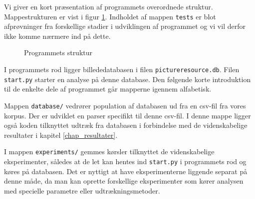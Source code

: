 {
{\sffamily Vi giver en kort præsentation af programmets overordnede
struktur. Mappestrukturen er vist i figur \ref{program_struktur}.
Indholdet af mappen \texttt{tests} er blot afprøvninger fra forskellige
stadier i udviklingen af programmet og vi vil derfor ikke komme nærmere
ind på dette.

\begin{figure}[!h]
    \caption[]{Programmets struktur}
    \label{program_struktur}
\end{figure}

I programmets rod ligger billededatabasen i filen
\texttt{pictureresource.db}. Filen \texttt{start.py} starter en analyse
på denne database. Den følgende korte introduktion til de enkelte dele
af programmet går mapperne igennem alfabetisk.

}

\vspace{1.4em}
\vspace{1.4em}
Mappen \texttt{database/} vedrører population af databasen ud fra en
csv-fil fra vores korpus. Der er udviklet en parser specifikt til denne
csv-fil. I denne mappe ligger også koden tilknyttet udtræk fra databasen
i forbindelse med de videnskabelige resultater i kapitel
\ref{chap_resultater}.

\vspace{1.4em}
\vspace{1.4em}

I mappen \texttt{experiments/} gemmes kørsler tilknyttet de
videnskabelige eksperimenter, således at de let kan hentes ind
\texttt{start.py} i programmets rod og køres på databasen. Det er
nyttigt at have eksperimenterne liggende separat på denne måde, da man
kan oprette forskellige eksperimenter som kører analysen med specielle
parametre eller udtrækningsmetoder.

\vspace{1.4em}
\vspace{1.4em}

}
